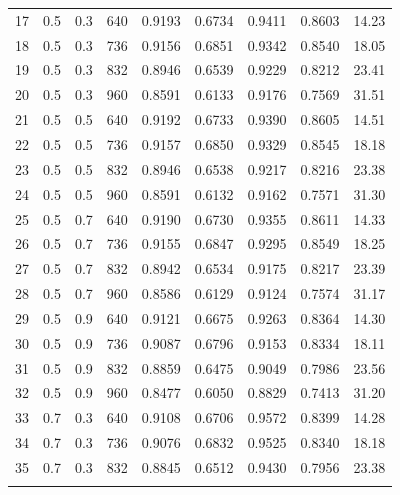 \begin{table}[H]
{\begin{tabular}{ccccccccc}
        17 & 0.5 & 0.3 & 640 & 0.9193  & 0.6734  & 0.9411  & 0.8603  & 14.23   \\ 
        \rowcolor{gray!10}
        18 & 0.5 & 0.3 & 736 & 0.9156  & 0.6851  & 0.9342  & 0.8540  & 18.05   \\ 
        19 & 0.5 & 0.3 & 832 & 0.8946  & 0.6539  & 0.9229  & 0.8212  & 23.41   \\ 
        \rowcolor{gray!10}
        20 & 0.5 & 0.3 & 960 & 0.8591  & 0.6133  & 0.9176  & 0.7569  & 31.51   \\ 
        21 & 0.5 & 0.5 & 640 & 0.9192  & 0.6733  & 0.9390  & 0.8605  & 14.51   \\ 
        \rowcolor{gray!10}
        22 & 0.5 & 0.5 & 736 & 0.9157  & 0.6850  & 0.9329  & 0.8545  & 18.18   \\ 
        23 & 0.5 & 0.5 & 832 & 0.8946  & 0.6538  & 0.9217  & 0.8216  & 23.38   \\ 
        \rowcolor{gray!10}
        24 & 0.5 & 0.5 & 960 & 0.8591  & 0.6132  & 0.9162  & 0.7571  & 31.30   \\ 
        25 & 0.5 & 0.7 & 640 & 0.9190  & 0.6730  & 0.9355  & 0.8611  & 14.33   \\ 
        \rowcolor{gray!10}
        26 & 0.5 & 0.7 & 736 & 0.9155  & 0.6847  & 0.9295  & 0.8549  & 18.25   \\ 
        27 & 0.5 & 0.7 & 832 & 0.8942  & 0.6534  & 0.9175  & 0.8217  & 23.39   \\ 
        \rowcolor{gray!10}
        28 & 0.5 & 0.7 & 960 & 0.8586  & 0.6129  & 0.9124  & 0.7574  & 31.17   \\ 
        29 & 0.5 & 0.9 & 640 & 0.9121  & 0.6675  & 0.9263  & 0.8364  & 14.30   \\ 
        \rowcolor{gray!10}
        30 & 0.5 & 0.9 & 736 & 0.9087  & 0.6796  & 0.9153  & 0.8334  & 18.11   \\ 
        31 & 0.5 & 0.9 & 832 & 0.8859  & 0.6475  & 0.9049  & 0.7986  & 23.56   \\ 
        \rowcolor{gray!10}
        32 & 0.5 & 0.9 & 960 & 0.8477  & 0.6050  & 0.8829  & 0.7413  & 31.20   \\ 
        33 & 0.7 & 0.3 & 640 & 0.9108  & 0.6706  & 0.9572  & 0.8399  & 14.28   \\ 
        \rowcolor{gray!10}
        34 & 0.7 & 0.3 & 736 & 0.9076  & 0.6832  & 0.9525  & 0.8340  & 18.18   \\ 
        35 & 0.7 & 0.3 & 832 & 0.8845  & 0.6512  & 0.9430  & 0.7956  & 23.38   \\ 
        \rowcolor{gray!10}

\end{tabular}}
\end{table}
